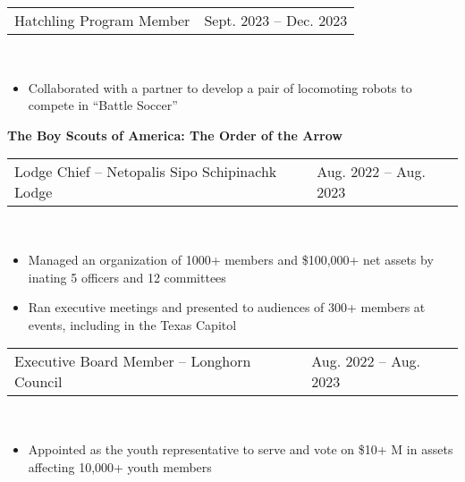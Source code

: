 \documentclass[18pt]{article}
\begin{document}
\begin{tabular}{p{} p{} }
    Hatchling Program Member
    &\hfill Sept. 2023 – Dec. 2023
\end{tabular}\\

\vspace{-0.75\baselineskip}
\begin{itemize}[noitemsep]
  \vspace{-\baselineskip}
  
  \item Collaborated with a partner to develop a pair of locomoting robots to compete in “Battle Soccer” 
  \vspace{-0.75\baselineskip}
\end{itemize}


\textbf{The Boy Scouts of America: The Order of the Arrow }\\

\vspace{-\baselineskip}
\begin{tabular}{p{} p{} }
    Lodge Chief – Netopalis Sipo Schipinachk Lodge
    &\hfill Aug. 2022 – Aug. 2023
\end{tabular}\\

\vspace{-0.75\baselineskip}
\begin{itemize}[noitemsep]
  \vspace{-\baselineskip}
  \item Managed an organization of 1000+ members and \$100,000+ net assets by inating 5 officers and 12 committees
  \item Ran executive meetings and presented to audiences of 300+ members at events, including in the Texas Capitol 
  \vspace{-0.5\baselineskip}
\end{itemize}


\begin{tabular}{p{} p{} }
    Executive Board Member – Longhorn Council
    &\hfill Aug. 2022 – Aug. 2023
\end{tabular}\\

\vspace{-0.75\baselineskip}
\begin{itemize}[noitemsep]
  \vspace{-\baselineskip}
  \item Appointed as the youth representative to serve and vote on \$10+ M in assets affecting 10,000+ youth members
  
\end{itemize}
\end{document}
